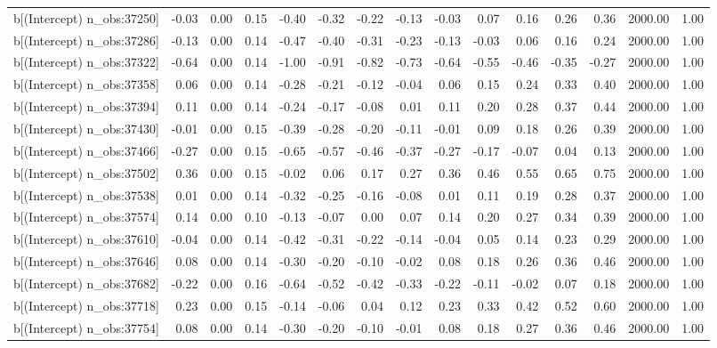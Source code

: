 \begin{table}[ht]
\begin{tabular}{rrrrrrrrrrrrrrr}
  b[(Intercept) n\_obs:37250] & -0.03 & 0.00 & 0.15 & -0.40 & -0.32 & -0.22 & -0.13 & -0.03 & 0.07 & 0.16 & 0.26 & 0.36 & 2000.00 & 1.00 \\ 
  b[(Intercept) n\_obs:37286] & -0.13 & 0.00 & 0.14 & -0.47 & -0.40 & -0.31 & -0.23 & -0.13 & -0.03 & 0.06 & 0.16 & 0.24 & 2000.00 & 1.00 \\ 
  b[(Intercept) n\_obs:37322] & -0.64 & 0.00 & 0.14 & -1.00 & -0.91 & -0.82 & -0.73 & -0.64 & -0.55 & -0.46 & -0.35 & -0.27 & 2000.00 & 1.00 \\ 
  b[(Intercept) n\_obs:37358] & 0.06 & 0.00 & 0.14 & -0.28 & -0.21 & -0.12 & -0.04 & 0.06 & 0.15 & 0.24 & 0.33 & 0.40 & 2000.00 & 1.00 \\ 
  b[(Intercept) n\_obs:37394] & 0.11 & 0.00 & 0.14 & -0.24 & -0.17 & -0.08 & 0.01 & 0.11 & 0.20 & 0.28 & 0.37 & 0.44 & 2000.00 & 1.00 \\ 
  b[(Intercept) n\_obs:37430] & -0.01 & 0.00 & 0.15 & -0.39 & -0.28 & -0.20 & -0.11 & -0.01 & 0.09 & 0.18 & 0.26 & 0.39 & 2000.00 & 1.00 \\ 
  b[(Intercept) n\_obs:37466] & -0.27 & 0.00 & 0.15 & -0.65 & -0.57 & -0.46 & -0.37 & -0.27 & -0.17 & -0.07 & 0.04 & 0.13 & 2000.00 & 1.00 \\ 
  b[(Intercept) n\_obs:37502] & 0.36 & 0.00 & 0.15 & -0.02 & 0.06 & 0.17 & 0.27 & 0.36 & 0.46 & 0.55 & 0.65 & 0.75 & 2000.00 & 1.00 \\ 
  b[(Intercept) n\_obs:37538] & 0.01 & 0.00 & 0.14 & -0.32 & -0.25 & -0.16 & -0.08 & 0.01 & 0.11 & 0.19 & 0.28 & 0.37 & 2000.00 & 1.00 \\ 
  b[(Intercept) n\_obs:37574] & 0.14 & 0.00 & 0.10 & -0.13 & -0.07 & 0.00 & 0.07 & 0.14 & 0.20 & 0.27 & 0.34 & 0.39 & 2000.00 & 1.00 \\ 
  b[(Intercept) n\_obs:37610] & -0.04 & 0.00 & 0.14 & -0.42 & -0.31 & -0.22 & -0.14 & -0.04 & 0.05 & 0.14 & 0.23 & 0.29 & 2000.00 & 1.00 \\ 
  b[(Intercept) n\_obs:37646] & 0.08 & 0.00 & 0.14 & -0.30 & -0.20 & -0.10 & -0.02 & 0.08 & 0.18 & 0.26 & 0.36 & 0.46 & 2000.00 & 1.00 \\ 
  b[(Intercept) n\_obs:37682] & -0.22 & 0.00 & 0.16 & -0.64 & -0.52 & -0.42 & -0.33 & -0.22 & -0.11 & -0.02 & 0.07 & 0.18 & 2000.00 & 1.00 \\ 
  b[(Intercept) n\_obs:37718] & 0.23 & 0.00 & 0.15 & -0.14 & -0.06 & 0.04 & 0.12 & 0.23 & 0.33 & 0.42 & 0.52 & 0.60 & 2000.00 & 1.00 \\ 
  b[(Intercept) n\_obs:37754] & 0.08 & 0.00 & 0.14 & -0.30 & -0.20 & -0.10 & -0.01 & 0.08 & 0.18 & 0.27 & 0.36 & 0.46 & 2000.00 & 1.00 \\ 

\end{tabular}
\end{table}
